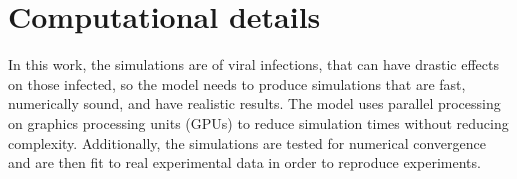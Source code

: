 \begin{table}
\caption{Parameter values to simulate an influenza infection with the ABM/PDM model.\label{tab_params}}
\end{table}


\section{Computational details}

In this work, the simulations are of viral infections, that can have drastic effects on those infected, so the model needs to produce simulations that are fast, numerically sound, and have realistic results. The model uses parallel processing on graphics processing units (GPUs) to reduce simulation times without reducing complexity. Additionally, the simulations are tested for numerical convergence and are then fit to real experimental data in order to reproduce experiments.

